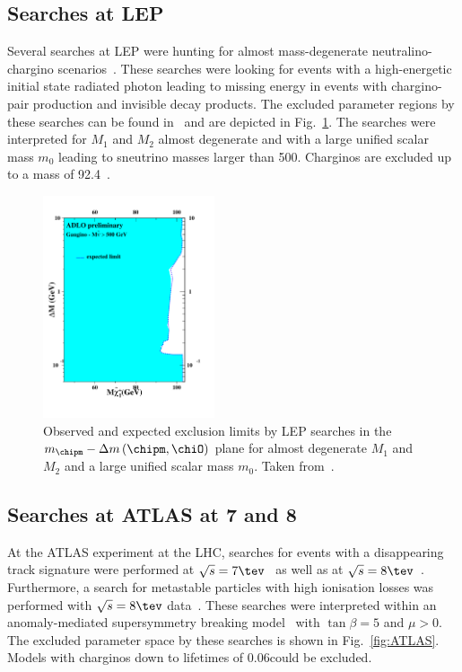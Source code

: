 \subsection*{Searches at LEP}
Several searches at LEP were hunting for almost mass-degenerate neutralino-chargino scenarios~\cite{bib:PreviousSearches_ALEPH,bib:PreviousSearches_OPAL,bib:PreviousSearches_DELPHI_2003,bib:PreviousSearches_DELPHI}.
These searches were looking for events with a high-energetic initial state radiated photon leading to missing energy in events with chargino-pair production and invisible decay products.
The excluded parameter regions by these searches can be found in~\cite{bib:LEP:SUSY_results} and are depicted in Fig.~\ref{fig:LEP}.
The searches were interpreted for $M_1$ and $M_2$ almost degenerate and with a large unified scalar mass $m_0$ leading to sneutrino masses larger than 500\gev. 
Charginos are excluded up to a mass of 92.4\gev~\cite{bib:LEP:SUSY_results}.
\begin{figure}[!t]
  \centering
      \includegraphics[width=0.45\textwidth]{figures/theory/mass_adlo_gaug_1.pdf}
  \caption{Observed and expected exclusion limits by LEP searches in the $m_{\chipm}-\Delta m \left( \chipm, \chiO \right)$ plane for almost degenerate $M_1$ and $M_2$ and a large unified scalar mass $m_0$. Taken from~\cite{bib:LEP:SUSY_results}.}  
  \label{fig:LEP}
\end{figure}

\subsection*{Searches at ATLAS at 7 and 8\tev}
At the ATLAS experiment at the LHC, searches for events with a disappearing track signature were performed at $\sqrt{s}=7\tev$~\cite{bib:PreviousSearches_Atlas_DT_7TeV} as well as at $\sqrt{s}=8\tev$~\cite{bib:PreviousSearches_Atlas_DT_8TeV}. 
Furthermore, a search for metastable particles with high ionisation losses was performed with $\sqrt{s}=8\tev$ data~\cite{bib:PreviousSearches_ATLAS_DEDX}.
These searches were interpreted within an anomaly-mediated supersymmetry breaking model~\cite{bib:Theory_AMSB_1998} with $\tan\beta=5$ and $\mu>0$.
The excluded parameter space by these searches is shown in Fig.~\ref{fig:ATLAS}.
Models with charginos down to lifetimes of 0.06\ns could be excluded.

